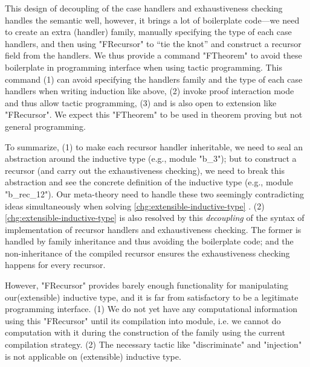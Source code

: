 
This design of decoupling of the case handlers and exhaustiveness checking handles the semantic well, however, it brings a lot of boilerplate code---we need to create an extra (handler) family, manually specifying the type of each case handlers, and then using "FRecursor" to ``tie the knot'' and construct a recursor field from the handlers.  
We thus provide a command "FTheorem" to avoid these boilerplate in programming interface when using tactic programming. 
This command (1) can avoid specifying the handlers family and the type of each case handlers when writing induction like above, (2) invoke
proof interaction mode and thus allow tactic programming, (3) and is also open to extension like "FRecursor". We expect this "FTheorem" to be used in theorem proving but not general programming. 

To summarize, (1) to make each recursor
handler inheritable, we need to seal an abstraction around the inductive
type (e.g., module "b_3"); but to construct a recursor (and carry out the
exhaustiveness checking), we need to break this abstraction and see the
concrete definition of the inductive type (e.g., module "b_rec_12"). Our
meta-theory need to handle these two seemingly contradicting ideas
simultaneously when solving \ref{chg:extensible-inductive-type} . (2) \ref{chg:extensible-inductive-type} is also resolved by this \textit{decoupling} of the syntax of implementation of recursor handlers and exhaustiveness checking. The former is handled by family inheritance and thus avoiding the boilerplate code; and the non-inheritance of the compiled recursor ensures the exhaustiveness checking happens for every recursor.  



However, "FRecursor" provides barely enough functionality for manipulating our(extensible) inductive type, and it is far from satisfactory to be a legitimate programming interface. (1) We do not yet have any computational information using this "FRecursor" until its compilation into module, i.e. we cannot do computation with it during the construction of the family using the current compilation strategy. (2) The necessary tactic like "discriminate" and "injection" is not applicable on (extensible) inductive type.



